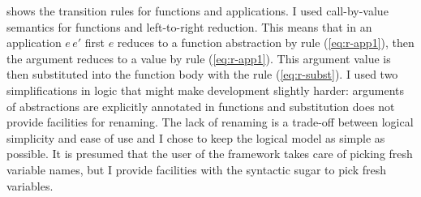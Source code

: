 \documentclass[12pt,twoside,notitlepage]{report}
\theoremstyle{plain}%
\theoremstyle{definition}
\theoremstyle{remark}
\begin{document}
 shows the transition rules for functions and applications. I used call-by-value semantics for functions and left-to-right reduction. This means that in an application $ e\,e' $ first $ e $ reduces to a function abstraction by rule (\ref{eq:r-app1}), then the argument reduces to a value by rule (\ref{eq:r-app1}). This argument value is then substituted into the function body with the rule (\ref{eq:r-subst}). I used two simplifications in logic that might make development slightly harder: arguments of abstractions are explicitly annotated in functions and substitution does not provide facilities for renaming. The lack of renaming is a trade-off between logical simplicity and ease of use and I chose to keep the logical model as simple as possible. It is presumed that the user of the framework takes care of picking fresh variable names, but I provide facilities with the syntactic sugar to pick fresh variables. \label{sec:subst_caveat}
\end{document}

